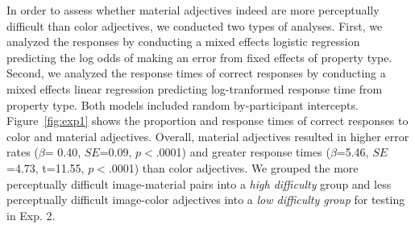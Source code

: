 \documentclass[12pt,letterpaper]{article}
\begin{document}
In order to assess whether material adjectives indeed are more perceptually difficult than color adjectives, we conducted two types of analyses. First, we analyzed the responses by conducting a mixed effects logistic regression predicting the log odds of making an error from fixed effects of property type. Second, we analyzed the response times of correct responses by conducting a mixed effects linear regression predicting log-tranformed response time from property type. Both models included random by-participant intercepts. Figure~\ref{fig:exp1} shows the proportion and response times of correct responses to color and material adjectives. Overall, material adjectives resulted in higher error rates ($\beta$= 0.40, $SE$=0.09, $p$$<$.0001) and greater response times ($\beta$=5.46, $SE$=4.73, t=11.55, $p$$<$.0001) than color adjectives. We grouped the more perceptually difficult image-material pairs into a \textit{high difficulty} group and less perceptually difficult image-color adjectives into a \textit{low difficulty group} for testing in Exp. 2.
\end{document}

